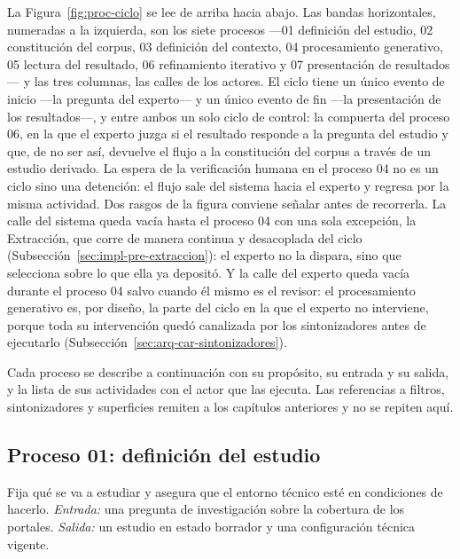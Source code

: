 \documentclass[12pt]{report}
\begin{document}
La Figura~\ref{fig:proc-ciclo} se lee de arriba hacia abajo. Las bandas horizontales, numeradas a la izquierda, son los siete procesos ---01 definición del estudio, 02 constitución del corpus, 03 definición del contexto, 04 procesamiento generativo, 05 lectura del resultado, 06 refinamiento iterativo y 07 presentación de resultados--- y las tres columnas, las calles de los actores. El ciclo tiene un único evento de inicio ---la pregunta del experto--- y un único evento de fin ---la presentación de los resultados---, y entre ambos un solo ciclo de control: la compuerta del proceso 06, en la que el experto juzga si el resultado responde a la pregunta del estudio y que, de no ser así, devuelve el flujo a la constitución del corpus a través de un estudio derivado. La espera de la verificación humana en el proceso 04 no es un ciclo sino una detención: el flujo sale del sistema hacia el experto y regresa por la misma actividad. Dos rasgos de la figura conviene señalar antes de recorrerla. La calle del sistema queda vacía hasta el proceso 04 con una sola excepción, la Extracción, que corre de manera continua y desacoplada del ciclo (Subsección~\ref{sec:impl-pre-extraccion}): el experto no la dispara, sino que selecciona sobre lo que ella ya depositó. Y la calle del experto queda vacía durante el proceso 04 salvo cuando él mismo es el revisor: el procesamiento generativo es, por diseño, la parte del ciclo en la que el experto no interviene, porque toda su intervención quedó canalizada por los sintonizadores antes de ejecutarlo (Subsección~\ref{sec:arq-car-sintonizadores}).

Cada proceso se describe a continuación con su propósito, su entrada y su salida, y la lista de sus actividades con el actor que las ejecuta. Las referencias a filtros, sintonizadores y superficies remiten a los capítulos anteriores y no se repiten aquí.

\subsection{Proceso 01: definición del estudio}
\label{sec:proc-requerimientos}

Fija qué se va a estudiar y asegura que el entorno técnico esté en condiciones de hacerlo. \textit{Entrada:} una pregunta de investigación sobre la cobertura de los portales. \textit{Salida:} un estudio en estado borrador y una configuración técnica vigente.
\end{document}

